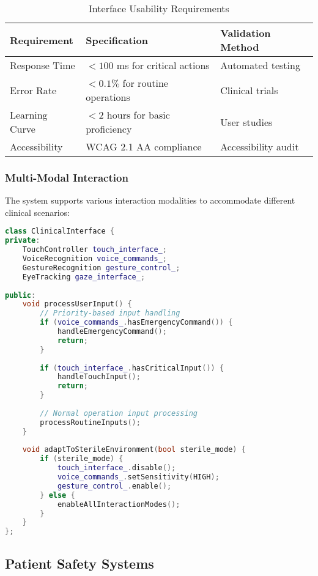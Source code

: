 \begin{table}[htbp]
\centering
\caption{Interface Usability Requirements}
\label{tab:usability-requirements}
\begin{tabular}{|l|l|l|}
\hline
\textbf{Requirement} & \textbf{Specification} & \textbf{Validation Method} \\
\hline
Response Time & $< 100$ ms for critical actions & Automated testing \\
Error Rate & $< 0.1\%$ for routine operations & Clinical trials \\
Learning Curve & $< 2$ hours for basic proficiency & User studies \\
Accessibility & WCAG 2.1 AA compliance & Accessibility audit \\
\hline
\end{tabular}
\end{table}

\subsubsection{Multi-Modal Interaction}
The system supports various interaction modalities to accommodate different clinical scenarios:

\begin{lstlisting}[language=C++, caption={Multi-Modal Interface Handler}, label={lst:multimodal-interface}]
class ClinicalInterface {
private:
    TouchController touch_interface_;
    VoiceRecognition voice_commands_;
    GestureRecognition gesture_control_;
    EyeTracking gaze_interface_;
    
public:
    void processUserInput() {
        // Priority-based input handling
        if (voice_commands_.hasEmergencyCommand()) {
            handleEmergencyCommand();
            return;
        }
        
        if (touch_interface_.hasCriticalInput()) {
            handleTouchInput();
            return;
        }
        
        // Normal operation input processing
        processRoutineInputs();
    }
    
    void adaptToSterileEnvironment(bool sterile_mode) {
        if (sterile_mode) {
            touch_interface_.disable();
            voice_commands_.setSensitivity(HIGH);
            gesture_control_.enable();
        } else {
            enableAllInteractionModes();
        }
    }
};
\end{lstlisting}

\subsection{Patient Safety Systems}

